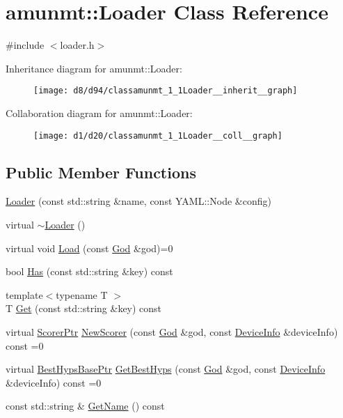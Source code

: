 \hypertarget{classamunmt_1_1Loader}{}\section{amunmt\+:\+:Loader Class Reference}
\label{classamunmt_1_1Loader}


{\ttfamily \#include $<$loader.\+h$>$}



Inheritance diagram for amunmt\+:\+:Loader\+:
\nopagebreak
\begin{figure}[H]
\begin{center}
\leavevmode
\texttt{[image: d8/d94/classamunmt\_1\_1Loader\_\_inherit\_\_graph]}
\end{center}
\end{figure}


Collaboration diagram for amunmt\+:\+:Loader\+:
\nopagebreak
\begin{figure}[H]
\begin{center}
\leavevmode
\texttt{[image: d1/d20/classamunmt\_1\_1Loader\_\_coll\_\_graph]}
\end{center}
\end{figure}
\subsection*{Public Member Functions}
\begin{DoxyCompactItemize}
\item 
\hyperlink{classamunmt_1_1Loader_ab0da3064fe4981b4584c680b592f807e}{Loader} (const std\+::string \&name, const Y\+A\+M\+L\+::\+Node \&config)
\item 
virtual \hyperlink{classamunmt_1_1Loader_aa27bd2ce4f7ac26a839c86448c85d4d5}{$\sim$\+Loader} ()
\item 
virtual void \hyperlink{classamunmt_1_1Loader_abe91595545e37f86e02781ebcd30d376}{Load} (const \hyperlink{classamunmt_1_1God}{God} \&god)=0
\item 
bool \hyperlink{classamunmt_1_1Loader_a3aa1a74d11f559e3377c69080ce3595b}{Has} (const std\+::string \&key) const 
\item 
{\footnotesize template$<$typename T $>$ }\\T \hyperlink{classamunmt_1_1Loader_a326350dac6f7d9e840069565f579a1ff}{Get} (const std\+::string \&key) const 
\item 
virtual \hyperlink{namespaceamunmt_a703e88438d533fef1db5cc95060b36f0}{Scorer\+Ptr} \hyperlink{classamunmt_1_1Loader_ae7d4a77639e94b4cd56a9dd3a8e1170d}{New\+Scorer} (const \hyperlink{classamunmt_1_1God}{God} \&god, const \hyperlink{structamunmt_1_1DeviceInfo}{Device\+Info} \&device\+Info) const =0
\item 
virtual \hyperlink{namespaceamunmt_a4a9522da34de52554ec07cedc30361b8}{Best\+Hyps\+Base\+Ptr} \hyperlink{classamunmt_1_1Loader_ae573f16f13820224c3b6d880473f20f9}{Get\+Best\+Hyps} (const \hyperlink{classamunmt_1_1God}{God} \&god, const \hyperlink{structamunmt_1_1DeviceInfo}{Device\+Info} \&device\+Info) const =0
\item 
const std\+::string \& \hyperlink{classamunmt_1_1Loader_aede9852e4ef857191be3490b0e544d9f}{Get\+Name} () const 
\end{DoxyCompactItemize}

